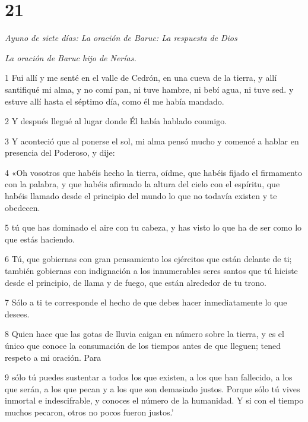 \chapter{21}

\par \textit{Ayuno de siete días: La oración de Baruc: La respuesta de Dios}

\par \textit{La oración de Baruc hijo de Nerías.}

\par 1 Fui allí y me senté en el valle de Cedrón, en una cueva de la tierra, y allí santifiqué mi alma, y ​​no comí pan, ni tuve hambre, ni bebí agua, ni tuve sed. y estuve allí hasta el séptimo día, como él me había mandado.

\par 2 Y después llegué al lugar donde Él había hablado conmigo.

\par 3 Y aconteció que al ponerse el sol, mi alma pensó mucho y comencé a hablar en presencia del Poderoso, y dije:

\par 4 «Oh vosotros que habéis hecho la tierra, oídme, que habéis fijado el firmamento con la palabra, y que habéis afirmado la altura del cielo con el espíritu, que habéis llamado desde el principio del mundo lo que no todavía existen y te obedecen.

\par 5 tú que has dominado el aire con tu cabeza, y has visto lo que ha de ser como lo que estás haciendo.

\par 6 Tú, que gobiernas con gran pensamiento los ejércitos que están delante de ti; también gobiernas con indignación a los innumerables seres santos que tú hiciste desde el principio, de llama y de fuego, que están alrededor de tu trono.

\par 7 Sólo a ti te corresponde el hecho de que debes hacer inmediatamente lo que desees.

\par 8 Quien hace que las gotas de lluvia caigan en número sobre la tierra, y es el único que conoce la consumación de los tiempos antes de que lleguen; tened respeto a mi oración. Para

\par 9 sólo tú puedes sustentar a todos los que existen, a los que han fallecido, a los que serán, a los que pecan y a los que son demasiado justos. Porque sólo tú vives inmortal e indescifrable, y conoces el número de la humanidad. Y si con el tiempo muchos pecaron, otros no pocos fueron justos.'

